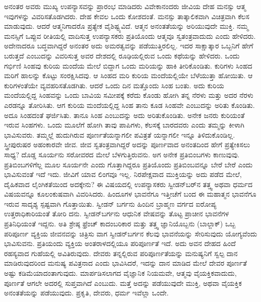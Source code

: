 ಅನಂತರ ಅವರು ಮುಖ್ಯ ಉಪನ್ಯಾಸವನ್ನು ಪ್ರಾರಂಭ ಮಾಡಿದರು ವಿವೇಕಾನಂದರು ಜೀವಿಯ ದೇಹ ಮನಸ್ಸು ಆತ್ಮ ಇವುಗಳನ್ನು ವಿವರಿಸತೊಡಗಿದರು. ದೇಹ ಕೇವಲ ಒಂದು ಕೋಶದಂತೆ. ಮನಸ್ಸು ತಾತ್ಕಾಲಿಕವಾಗಿ ವಿಚಿತ್ರವಾಗಿ ಕೆಲಸ ಮಾಡುವುದು. ಆದರೆ ಆತ್ಮನಿಗಾದರೊ ಪ್ರತ್ಯೇಕ ವೈಶಿಷ್ಟ್ಯವಿದೆ. ಆತ್ಮನ ಅನಂತತೆಯನ್ನು ಅರಿಯುವುದೇ ಮುಕ್ತಿ. ನಮ್ಮ ಮನಸ್ಸಿಗೆ ಒಪ್ಪುವ ರೀತಿಯಲ್ಲಿ ವಾದಿಸುತ್ತ ಉಪನ್ಯಾಸಕರು ಪ್ರತಿಯೊಂದು ಆತ್ಮವೂ ಸ್ವತಂತ್ರವಾದುದು ಎಂದು ಹೇಳಿದರು. ಅದೇನಾದರೂ ಬದ್ಧವಾಗಿದ್ದರೆ ಅನಂತರ ಅದು ಅಮರತ್ವವನ್ನು ಪಡೆಯುತ್ತಿರಲಿಲ್ಲ. ಇದರ ಸಾಕ್ಷಾತ್ಕಾರ ಒಬ್ಬನಿಗೆ ಹೇಗೆ ಬರುತ್ತದೆ ಎಂಬುದನ್ನು ವಿವರಿಸುತ್ತ ಅವರ ದೇಶದಲ್ಲಿ ರೂಢಿಯಲ್ಲಿರುವ ಒಂದು ಕಥೆಯನ್ನು ಹೇಳಿದರು. ಒಂದು ಗರ್ಭಿಣಿ ಸಿಂಹವು ಕುರಿಯ ಮಂದೆಯ ಮೇಲೆ ಬಿದ್ದಾಗ ಒಂದು ಮರಿಯನ್ನು ಹಾಕಿ ತೀರಿಕೊಂಡಿತು. ಕುರಿಗಳು ಸಿಂಹದ ಮರಿಗೆ ಹಾಲನ್ನು ಕೊಟ್ಟು ಸಂರಕ್ಷಿಸಿದವು. ಆ ಸಿಂಹದ ಮರಿ ಕುರಿಯ ಮಂದೆಯಲ್ಲಿಯೇ ಬೆಳೆಯುತ್ತಾ ಹೋಯಿತು. ಆ ಕುರಿಗಳಂತೆಯೇ ವ್ಯವಹರಿಸತೊಡಗಿತು. ಆದರೆ ಒಂದು ದಿನ ಮತ್ತೊಂದು ಸಿಂಹ ಬಂತು. ಅದು ಕುರಿಯ ಮಂದೆಯಲ್ಲಿದ್ದ ಸಿಂಹವನ್ನು ಒಂದು ಬಾವಿಯ ಸಮೀಪಕ್ಕೆ ಕರೆದು ಕೊಂಡು ಹೋಗಿ ತನ್ನ ನೆರಳು ಮತ್ತು ಅದರ ನೆರಳು ಎರಡನ್ನೂ ತೋರಿಸಿತು. ಆಗ ಕುರಿಯ ಮಂದೆಯಲ್ಲಿದ್ದ ಸಿಂಹ ತಾನು ಕೂಡ ಸಿಂಹವೇ ಎಂಬುದನ್ನು ಅರಿತು ಕೊಂಡಿತು. ಅದೂ ಸಿಂಹದಂತೆ ಘರ್ಜಿಸಿತು. ತಾನೂ ಸಿಂಹ ಎಂಬುದನ್ನು ಅದು ಅರಿತುಕೊಂಡಿತು. ಅನೇಕ ಜನರು ಕುರಿಯಂತೆ ಇರುವ ಸಿಂಹಗಳು. ಒಂದು ಮೂಲೆಗೆ ಹೋಗಿ ತಾವು ಪಾಪಿಗಳು, ಕೆಲಸಕ್ಕೆ ಬಾರದವರು ಎಂದು ತಮ್ಮನ್ನು ಕೀಳಾಗಿ ಭಾವಿಸುವರು. ತಮ್ಮಲ್ಲೆ ಹುದುಗಿರುವ ಪೂರ್ಣತೆಯನ್ನಾಗಲೀ ಪವಿತ್ರತೆ ಯನ್ನಾಗಲೀ ಇನ್ನೂ ತಿಳಿದುಕೊಂಡಿಲ್ಲ. ಸ್ತ್ರೀಪುರುಷರ ಅಹಂಕಾರವೇ ಜೀವ. ಜೀವ ಸ್ವತಂತ್ರವಾಗಿದ್ದರೆ ಅದನ್ನು ಪೂರ್ಣವಾದ ಅನಂತದಿಂದ ಹೇಗೆ ಪ್ರತ್ಯೇಕಿಸಲು ಸಾಧ್ಯ? ದೊಡ್ಡ ಸೂರ್ಯನು ಸರೋವರದ ಮೇಲೆ ಬೆಳಗುತ್ತಿರುವನು. ಅಗ ಅನೇಕ ಪ್ರತಿಬಿಂಬಗಳು ಕಾಣುವುವು. ಪ್ರತಿಬಿಂಬಗಳಿಗೆಲ್ಲ ಮೂಲ ಸೂರ್ಯನೇ ಎಂದು ಗೊತ್ತಾಗಿದ್ದರೂ ಪ್ರತಿಯೊಂದು ಪ್ರತಿಬಿಂಬವನ್ನೂ ಬೇರೆ ಬೇರೆ ಎಂದು ಭಾವಿಸುವಂತೆ ಇದೆ ಇದು. ಜೀವಿಗೆ ಯಾವ ಲಿಂಗವೂ ಇಲ್ಲ. ನಿರಪೇಕ್ಷವಾದ ಮುಕ್ತಿಯನ್ನು ಅದು ಪಡೆದ ಮೇಲೆ, ದೈಹಿಕವಾದ ಲೈಂಗಿಕತೆಯಿಂದ ಅದಕ್ಕೇನು? ಈ ವಿಷಯದಲ್ಲಿ ಉಪನ್ಯಾಸಕರು ಸ್ವೀಡನ್​ಬರ್​ನ ತತ್ತ್ವ ಅಥವಾ ಧರ್ಮದ ವಿಷಯವನ್ನೂ ಕೂಲಂಕುಷವಾಗಿ ವಿವರಿಸಿದರು. ಹಿಂದೂಗಳ ಭಾವನೆಗೂ ಇತ್ತೀಚೆಗೆ ಬಂದ ಈ ಮಹಾತ್ಮನ ಭಾವನೆಗೂ ಇರುವ ಸಾದೃಶ್ಯ ಸ್ಪಷ್ಟವಾಗಿ ಗೊತ್ತಾಯಿತು. ಸ್ವೀಡನ್​ ಬರ್ಗನು ಹಿಂದಿನ ಬ್ರಾಹ್ಮಣ ವರ್ಗದ ಐರೋಪ್ಯ ಉತ್ತರಾಧಿಕಾರಿಯಂತೆ ತೋರಿ ದನು. ಸ್ವೀಡನ್​ಬರ್ಗನು ಆಧುನಿಕ ವೇಷವನ್ನು ತೊಟ್ಟ ಪ್ರಾಚೀನ ಭಾವನೆಗಳ ಪ್ರತಿನಿಧಿಯಂತೆ ಇದ್ದನು. ಅತಿ ಶ್ರೇಷ್ಠ ಫ್ರೆಂಚ್​ ಕಾದಂಬರಿಕಾರ ಮತ್ತು ತತ್ತ್ವ ಜ್ಞಾನಿಯೊಬ್ಬನು (ಬಾಲ್ಜಾಕ್​) ಒಬ್ಬ ಪರಿಪೂರ್ಣ ವ್ಯಕ್ತಿಯ ಜೀವನವನ್ನು ಚಿತ್ರಿಸು ವಾಗ ಸ್ವೀಡನ್​ಬರ್ಗನ ಕೆಲವು ಭಾವನೆಯನ್ನು ಸೇರಿಸುವುದು ಯೋಗ್ಯವೆಂದು ಭಾವಿಸುವನು. ಪ್ರತಿಯಂದು ವ್ಯಕ್ತಿಯ ಅಂತರಾಳದಲ್ಲಿಯೂ ಪರಿಪೂರ್ಣತೆ ಇದೆ. ಅದು ಅವನ ದೇಹದ ಹಿಂದೆ ರಹಸ್ಯವಾದ ಗುಹೆಯಲ್ಲಿ ಅವಿತಿರುವುದು. ದೇವರು ತನ್ನಲ್ಲಿರುವ ಪರಿಪೂರ್ಣತೆಯನ್ನು ಮನುಷ್ಯನಿಗೆ ಸ್ವಲ್ಪ ದಾನ ಮಾಡಿರುವುದರಿಂದ ಮನುಷ್ಯ ಪವಿತ್ರನಾದ ಎಂದು ಭಾವಿಸಿದರೆ, ಇದನ್ನು ದಾನ ಮಾಡಿದ ಮೇಲೆ ದೇವರ ಪೂರ್ಣತೆ ಅಷ್ಟು ಕಡಿಮೆಯಾದಂತಾಗುವುದು. ಮಾರ್ಪಡಿಸಲಾಗದ ವೈಜ್ಞಾನಿಕ ನಿಯಮವೇ, ಆತ್ಮವು ವೈಯಕ್ತಿಕವಾದುದು, ಪೂರ್ಣತೆ ಆಗಲೇ ಅದರಲ್ಲಿ ಸುಪ್ತವಾಗಿದೆ ಎಂಬುದು. ಮತ್ತೆ ಅದನ್ನು ಪಡೆಯುವುದೇ ಮುಕ್ತಿ, ಅಥವಾ ವೈಯಕ್ತಿಕ ಅನಂತತೆಯನ್ನು ಪಡೆಯುವುದು. ಪ್ರಕೃತಿ, ದೇವರು, ಧರ್ಮ ಇವೆಲ್ಲಾ ಒಂದೇ.

